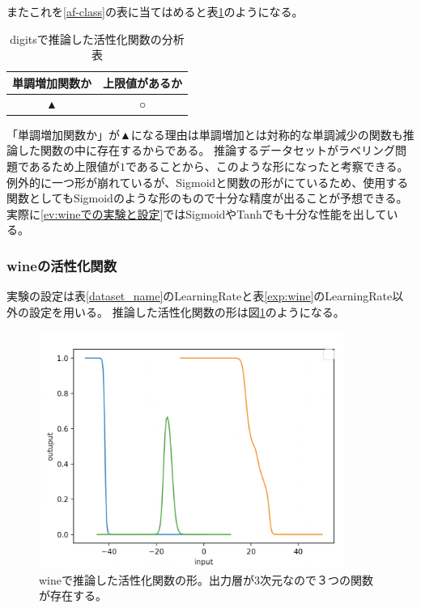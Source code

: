 またこれを\ref{af-class}の表に当てはめると表\ref{anal_digits}のようになる。
\begin{table}[htbp]
    \begin{center}
        \caption{digitsで推論した活性化関数の分析表}
        \label{anal_digits}
        \vspace{2mm} 
        \begin{tabular}{ |c|c| }
        \hline
        単調増加関数か  & 上限値があるか   \\
        \hline
        ▲ & ○   \\
        \hline
        \end{tabular}
    \end{center}
\end{table}

「単調増加関数か」が▲になる理由は単調増加とは対称的な単調減少の関数も推論した関数の中に存在するからである。
推論するデータセットがラベリング問題であるため上限値が$ 1 $であることから、このような形になったと考察できる。
例外的に一つ形が崩れているが、Sigmoidと関数の形がにているため、使用する関数としてもSigmoidのような形のもので十分な精度が出ることが予想できる。
実際に\ref{ev:wineでの実験と設定}ではSigmoidやTanhでも十分な性能を出している。


\subsubsection{wineの活性化関数}
\label{evo2:wine_result}
実験の設定は表\ref{dataset_name}のLearningRateと表\ref{exp:wine}のLearningRate以外の設定を用いる。
推論した活性化関数の形は図\ref{infer_wine}のようになる。
\begin{figure}[hbtp]
    \begin{center}
        \includegraphics[width=10cm]{asset/wine-0.01.png}
            \caption{wineで推論した活性化関数の形。出力層が3次元なので３つの関数が存在する。}
            \label{infer_wine}
    \end{center}
\end{figure}

